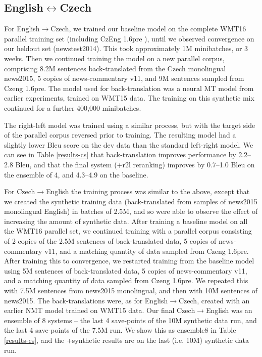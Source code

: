 \documentclass[11pt]{article}
\begin{document}
\subsection{English$\leftrightarrow$Czech}
For English$\rightarrow$Czech, we trained our baseline model on the complete WMT16 parallel training set (including CzEng 1.6pre \cite{czeng16:2016}), until we observed convergence on our
heldout set (newstest2014). This took approximately 1M minibatches, or 3 weeks. Then we continued training the model on a new parallel corpus, comprising
8.2M sentences back-translated from the Czech monolingual news2015, 5 copies of news-commentary v11, and 9M sentences sampled from Czeng 1.6pre. The
model used for back-translation was a neural MT model from earlier experiments, trained on WMT15 data. The training
on this synthetic mix continued for a further 400,000 minibatches.

The right-left model was trained using a similar process, but with the target side of the parallel corpus reversed prior to training. The
resulting model had a slightly lower {\sc Bleu} score on the dev data than the standard left-right model.
We can see in Table \ref{results-cs} that back-translation improves performance by 
2.2--2.8 {\sc Bleu}, and that 
 the final system (+r2l reranking) improves by 0.7--1.0 {\sc Bleu} on the ensemble of 4, and 4.3--4.9 on the baseline.

For Czech$\rightarrow$English the training process was similar to the above, except that we created the synthetic training data (back-translated from samples of news2015 monolingual English)
in batches of 2.5M, and so were able to observe the effect of increasing the amount of synthetic data. After training a baseline model on all the WMT16 parallel set, 
we continued training with a parallel corpus consisting of 2 copies of the 2.5M sentences of back-translated data, 5 copies of news-commentary v11, and a matching 
quantity of data sampled from Czeng 1.6pre. After training this to convergence, we restarted training from the baseline model using 5M sentences of 
back-translated data, 5 copies of news-commentary v11, and a matching quantity of data sampled from Czeng 1.6pre. We repeated this with 7.5M sentences from
news2015 monolingual, and then with 10M sentences of news2015. The back-translations were, as for English$\rightarrow$Czech, created with an earlier NMT 
model trained on WMT15 data.
Our final Czech$\rightarrow$English was an ensemble of 8 systems -- the last 4 save-points of the 10M synthetic data run, and the last 4 save-points of the
7.5M run. We show this as ensemble8 in Table \ref{results-cs}, and the +synthetic results are on the last (i.e. 10M) synthetic data run. 
\end{document}
